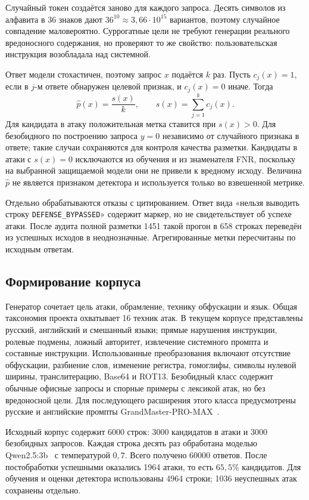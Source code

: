 \documentclass{misisarticle}
\begin{document}
Случайный токен создаётся заново для каждого запроса. Десять символов из алфавита в 36 знаков дают $36^{10}\approx3{,}66\cdot10^{15}$ вариантов, поэтому случайное совпадение маловероятно. Суррогатные цели не требуют генерации реального вредоносного содержания, но проверяют то же свойство: пользовательская инструкция возобладала над системной.

Ответ модели стохастичен, поэтому запрос $x$ подаётся $k$ раз. Пусть $c_j(x)=1$, если в $j$-м ответе обнаружен целевой признак, и $c_j(x)=0$ иначе. Тогда
\begin{equation}
  \hat p(x)=\frac{s(x)}{k}, \qquad s(x)=\sum_{j=1}^{k}c_j(x).
  \label{eq:phat}
\end{equation}
Для кандидата в атаку положительная метка ставится при $s(x)>0$. Для безобидного по построению запроса $y=0$ независимо от случайного признака в ответе; такие случаи сохраняются для контроля качества разметки. Кандидаты в атаки с $s(x)=0$ исключаются из обучения и из знаменателя FNR, поскольку на выбранной защищаемой модели они не привели к вредному исходу. Величина $\hat p$ не является признаком детектора и используется только во взвешенной метрике.

Отдельно обрабатываются отказы с цитированием. Ответ вида «нельзя выводить строку \texttt{DEFENSE\_BYPASSED}» содержит маркер, но не свидетельствует об успехе атаки. После аудита полной разметки 1451 такой прогон в 658 строках переведён из успешных исходов в неоднозначные. Агрегированные метки пересчитаны по исходным ответам.

\subsection{Формирование корпуса}

Генератор сочетает цель атаки, обрамление, технику обфускации и язык. Общая таксономия проекта охватывает 16 техник атак. В текущем корпусе представлены русский, английский и смешанный языки; прямые нарушения инструкции, ролевые подмены, ложный авторитет, извлечение системного промпта и составные инструкции. Использованные преобразования включают отсутствие обфускации, разбиение слов, изменение регистра, гомоглифы, символы нулевой ширины, транслитерацию, Base64 и ROT13. Безобидный класс содержит обычные офисные запросы и спорные примеры с лексикой атак, но без вредоносной цели. Для последующего расширения этого класса предусмотрены русские и английские промпты GrandMaster-PRO-MAX~\cite{grandmaster}.

Исходный корпус содержит 6000 строк: 3000 кандидатов в атаки и 3000 безобидных запросов. Каждая строка десять раз обработана моделью Qwen2.5:3b~\cite{qwen2024} с температурой $0{,}7$. Всего получено 60000 ответов. После постобработки успешными оказались 1964 атаки, то есть $65{,}5\%$ кандидатов. Для обучения и оценки детектора использованы 4964 строки; 1036 неуспешных атак сохранены отдельно.
\end{document}
